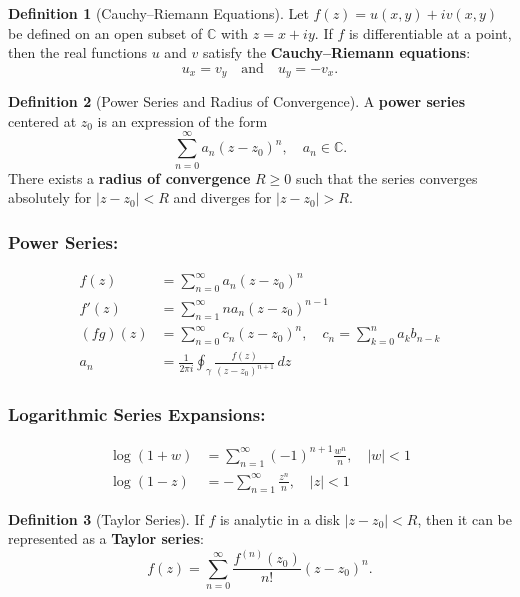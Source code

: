 \documentclass[12pt]{article}
\theoremstyle{definition} %
\newtheorem{definition}{Definition}
\theoremstyle{plain} %
\begin{document}
\begin{definition}[Cauchy--Riemann Equations]
Let \(f(z)=u(x,y)+iv(x,y)\) be defined on an open subset of \(\mathbb{C}\) with \(z=x+iy\). If \(f\) is differentiable at a point, then the real functions \(u\) and \(v\) satisfy the \textbf{Cauchy--Riemann equations}:
\[
u_x = v_y \quad \text{and} \quad u_y = -v_x.
\]
\end{definition}

\begin{definition}[Power Series and Radius of Convergence]
A \textbf{power series} centered at \(z_0\) is an expression of the form
\[
\sum_{n=0}^{\infty} a_n (z-z_0)^n, \quad a_n\in \mathbb{C}.
\]
There exists a \textbf{radius of convergence} \(R \ge 0\) such that the series converges absolutely for \(|z-z_0| < R\) and diverges for \(|z-z_0| > R\).
\end{definition}

\subsubsection*{Power Series:}

\begin{align*}
f(z) &= \sum_{n=0}^{\infty} a_n (z - z_0)^n \\[6pt]
f'(z) &= \sum_{n=1}^{\infty} n a_n (z - z_0)^{n-1} \\[6pt]
(fg)(z) &= \sum_{n=0}^{\infty} c_n (z - z_0)^n, \quad c_n = \sum_{k=0}^{n} a_k b_{n-k} \\[6pt]
a_n &= \frac{1}{2\pi i} \oint_\gamma \frac{f(z)}{(z - z_0)^{n+1}}\,dz
\end{align*}

\subsubsection*{Logarithmic Series Expansions:}

\begin{align*}
\log(1 + w) &= \sum_{n=1}^{\infty} (-1)^{n+1}\frac{w^n}{n}, \quad |w|<1 \\[6pt]
\log(1 - z) &= -\sum_{n=1}^{\infty} \frac{z^n}{n}, \quad |z|<1
\end{align*}

\begin{definition}[Taylor Series]
If \(f\) is analytic in a disk \(|z-z_0| < R\), then it can be represented as a \textbf{Taylor series}:
\[
f(z) = \sum_{n=0}^{\infty} \frac{f^{(n)}(z_0)}{n!}(z-z_0)^n.
\]
\end{definition}
\end{document}
